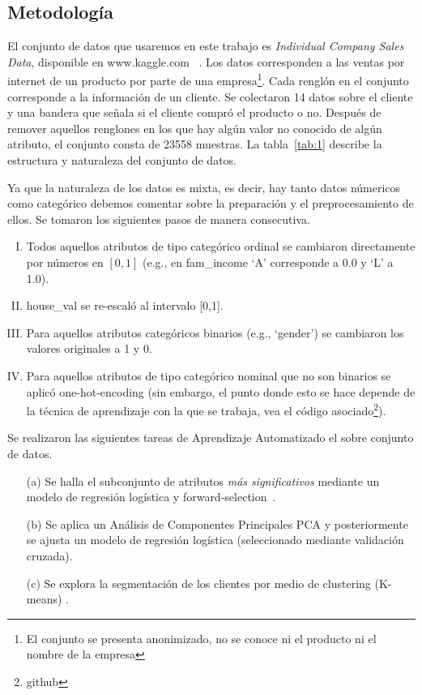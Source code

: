 \documentclass[letterpaper,11pt]{article}
\begin{document}
\begin{multicols}{2}
\section{Metodología}
El conjunto de datos que usaremos en este trabajo es \emph{Individual Company Sales Data}, disponible en www.kaggle.com~
\cite{kaggle}. Los datos corresponden a las ventas por internet de un producto por parte de una 
empresa\footnote{El conjunto se presenta anonimizado, no se conoce ni el producto ni el nombre de la empresa}. Cada
renglón en el conjunto corresponde a la información de un cliente.  Se colectaron 14 datos sobre el cliente y una bandera
que señala si el cliente compró el producto o no. Después de remover aquellos renglones en los que hay algún valor
no conocido de algún atributo, el conjunto consta de 23558 muestras. La tabla~\ref{tab:1} describe la estructura y 
naturaleza del conjunto de datos.

Ya que la naturaleza de los datos es mixta, es decir, hay tanto datos númericos como categórico
debemos comentar sobre la preparación y el preprocesamiento de ellos. Se tomaron los siguientes pasos de manera
consecutiva. 

\begin{enumerate}[I.]
    \item Todos aquellos atributos de tipo categórico ordinal se cambiaron directamente por números en $[0,1]$
        (e.g., en fam\_income `A' corresponde a 0.0 y `L' a 1.0). 
    \item house\_val se re-escaló al intervalo [0,1]. 
    \item Para aquellos atributos categóricos binarios (e.g., `gender') se cambiaron los valores originales a 1 y 0. 
    \item Para aquellos atributos de tipo categórico nominal que no son binarios se aplicó one-hot-encoding (sin
            embargo, el punto donde esto se hace depende de la técnica de aprendizaje con la que se trabaja, vea el
        código asociado\footnote{github}). 
\end{enumerate}
Se realizaron las siguientes tareas de Aprendizaje Automatizado el sobre conjunto de datos.

\begin{itemize}
    \item[(a)] Se halla el subconjunto de atributos \emph{más significativos} mediante un modelo de regresión logística
        y forward-selection~\cite[Cap. 6]{book1}.
    \item[(b)] Se aplica un Análisis de Componentes Principales PCA \cite{book2} y posteriormente se ajusta un modelo de regresión
        logística (seleccionado mediante validación cruzada). 
    \item[(c)] Se explora la segmentación de los clientes por medio de clustering (K-means) \cite{segmen}.
\end{itemize}
\end{multicols}
\end{document}
